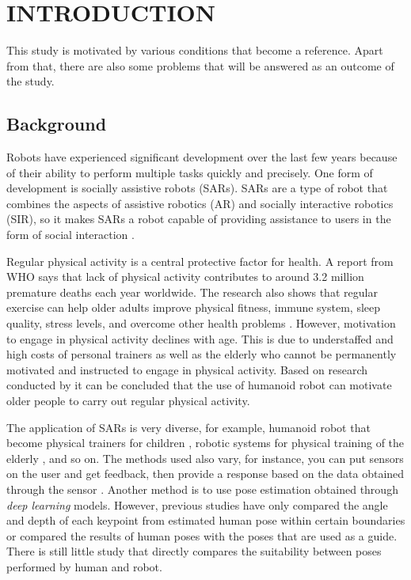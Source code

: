 \chapter{INTRODUCTION}
\label{chap:introduction}

This study is motivated by various conditions that become a reference. Apart from that, there are also some problems that
will be answered as an outcome of the study.

\section{Background}
\label{sec:background}

Robots have experienced significant development over the last few years 
because of their ability to perform multiple tasks quickly and precisely.
One form of development is socially assistive robots (SARs). 
SARs are a type of robot that combines the aspects of assistive robotics (AR)
and socially interactive robotics (SIR), so it makes SARs a robot capable of providing assistance to users in the form of social interaction \parencite{feil2005}.

Regular physical activity is a central protective factor for health.
A report from WHO says that lack of physical activity contributes to around 3.2 million premature deaths each year worldwide.
The research also shows that regular exercise can help older adults improve physical fitness, immune system, sleep quality, stress levels, and overcome other health problems \parencite{lotfi2018}.
However, motivation to engage in physical activity declines with age. 
This is due to understaffed and high costs of personal trainers as well as the elderly who cannot be permanently motivated and instructed to engage in physical activity.
Based on research conducted by \parencite{ruf2020} it can be concluded that the use of humanoid robot can motivate older people to carry out regular physical activity.

The application of SARs is very diverse, for example, humanoid robot that become physical trainers for children \parencite{güneysu2017}, 
robotic systems for physical training of the elderly \parencite{avioz2021}, and so on. The methods used also vary, for instance, 
you can put sensors on the user and get feedback, then provide a response based on the data obtained through the sensor \parencite{güneysu2017}. 
Another method is to use pose estimation obtained through \emph{deep learning} models.
However, previous studies have only compared the angle and depth of each keypoint from estimated human pose within certain boundaries or compared the results of human poses with the poses that are used as a guide. \parencite{romeo}
There is still little study that directly compares the suitability between poses performed by human and robot.

